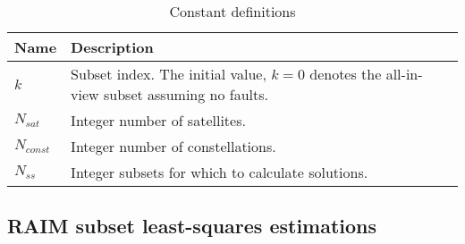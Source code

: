 \documentclass[11pt]{article}
\begin{document}
\begin{table}[htbp] \centering
  \caption{Constant definitions}\label{tab:exp}
  \begin{tabular}{|m{2cm}|m{11cm}|}
    \hline
    \textbf{Name} & \textbf{Description}\\ \hline
    $k$ & Subset index. The initial value, $k=0$ denotes the all-in-view subset assuming no faults.\\ \hline
    $N_{sat}$ & Integer number of satellites.\\ \hline
    $N_{const}$ & Integer number of constellations.\\ \hline
    $N_{ss}$ & Integer subsets for which to calculate solutions.\\ \hline
  \end{tabular}
\end{table}

\subsection{RAIM subset least-squares estimations}
\end{document}

